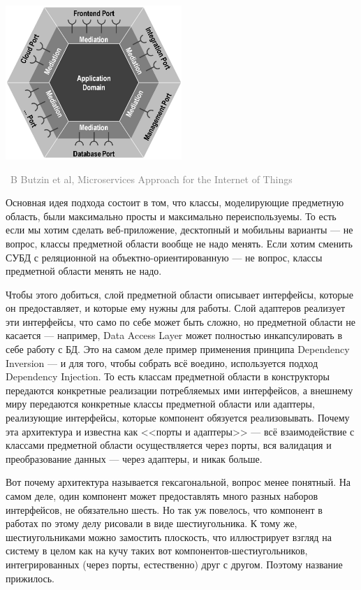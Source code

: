 \documentclass[a5paper]{article}
\newcommand{\attribution}[1] {
    \vspace{-4mm}\begin{flushright}\begin{scriptsize}\textcolor{gray}
    {\textcopyright\, #1}\end{scriptsize}\end{flushright}
}
\begin{document}
\begin{center}
    \includegraphics[width=0.5\textwidth]{hexagonalArchitecture.png}
    \attribution{B Butzin et al, Microservices Approach for the Internet of Things}
\end{center}

Основная идея подхода состоит в том, что классы, моделирующие предметную область, были максимально просты и максимально переиспользуемы. То есть если мы хотим сделать веб-приложение, десктопный и мобильны варианты --- не вопрос, классы предметной области вообще не надо менять. Если хотим сменить СУБД с реляционной на объектно-ориентированную --- не вопрос, классы предметной области менять не надо.

Чтобы этого добиться, слой предметной области описывает интерфейсы, которые он предоставляет, и которые ему нужны для работы. Слой адаптеров реализует эти интерфейсы, что само по себе может быть сложно, но предметной области не касается --- например, Data Access Layer может полностью инкапсулировать в себе работу с БД. Это на самом деле пример применения принципа Dependency Inversion --- и для того, чтобы собрать всё воедино, используется подход Dependency Injection. То есть классам предметной области в конструкторы передаются конкретные реализации потребляемых ими интерфейсов, а внешнему миру передаются конкретные классы предметной области или адаптеры, реализующие интерфейсы, которые компонент обязуется реализовывать. Почему эта архитектура и известна как <<порты и адаптеры>> --- всё взаимодействие с классами предметной области осуществляется через порты, вся валидация и преобразование данных --- через адаптеры, и никак больше.

Вот почему архитектура называется гексагональной, вопрос менее понятный. На самом деле, один компонент может предоставлять много разных наборов интерфейсов, не обязательно шесть. Но так уж повелось, что компонент в работах по этому делу рисовали в виде шестиугольника. К тому же, шестиугольниками можно замостить плоскость, что иллюстрирует взгляд на систему в целом как на кучу таких вот компонентов-шестиугольников, интегрированных (через порты, естественно) друг с другом. Поэтому название прижилось.
\end{document}
